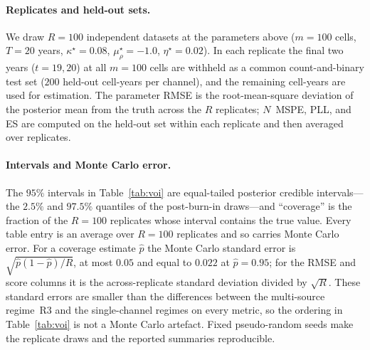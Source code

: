 \documentclass[preprint,12pt]{elsarticle}
\theoremstyle{definition}
\begin{document}
\paragraph{Replicates and held-out sets.}
We draw $R=100$ independent datasets at the parameters above ($m=100$ cells,
$T=20$ years, $\kappa^\star=0.08$, $\mu_\rho^\star=-1.0$, $\eta^\star=0.02$).
In each replicate the final two years ($t=19,20$) at all $m=100$ cells are
withheld as a common count-and-binary test set ($200$ held-out cell-years per
channel), and the remaining cell-years are used for estimation. The parameter
RMSE is the root-mean-square deviation of the posterior mean from the truth
across the $R$ replicates; $N$~MSPE, PLL, and ES are computed on the held-out
set within each replicate and then averaged over replicates.

\paragraph{Intervals and Monte Carlo error.}
The $95\%$ intervals in Table~\ref{tab:voi} are equal-tailed posterior credible
intervals---the $2.5\%$ and $97.5\%$ quantiles of the post-burn-in draws---and
``coverage'' is the fraction of the $R=100$ replicates whose interval contains
the true value. Every table entry is an average over $R=100$ replicates and so
carries Monte Carlo error. For a coverage estimate $\hat p$ the Monte Carlo
standard error is $\sqrt{\hat p(1-\hat p)/R}$, at most $0.05$ and equal to
$0.022$ at $\hat p=0.95$; for the RMSE and score columns it is the
across-replicate standard deviation divided by $\sqrt{R}$. These standard
errors are smaller than the differences between the multi-source regime~R3 and
the single-channel regimes on every metric, so the ordering in
Table~\ref{tab:voi} is not a Monte Carlo artefact. Fixed pseudo-random seeds
make the replicate draws and the reported summaries reproducible.
\end{document}
